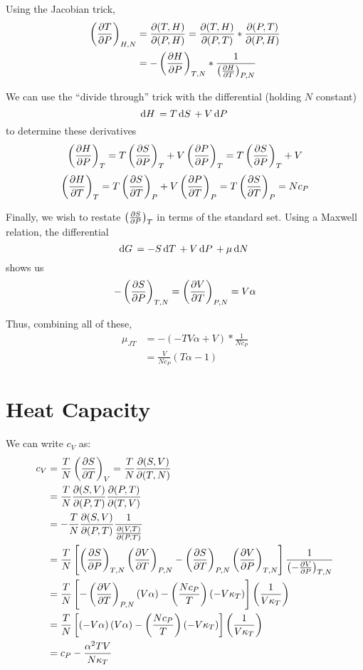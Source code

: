Using the Jacobian trick,
\begin{align*}
	\left(\frac{\partial T}{\partial P}\right)_{H,N}&=\frac{\partial (T,H)}{\partial (P,H)}=\frac{\partial (T,H)}{\partial (P,T)}*\frac{\partial (P,T)}{\partial (P,H)}\\
				      &=-\left(\frac{\partial H}{\partial P}\right)_{T,N}*\frac{1}{\left(\frac{\partial H}{\partial T}\right)_{P,N}}
\end{align*}

We can use the ``divide through'' trick with the differential (holding \(N\) constant)
\[\d{H}=T\d{S}+V\d{P}\]
to determine these derivatives
\[\left(\frac{\partial H}{\partial P}\right)_T=T\left(\frac{\partial S}{\partial P}\right)_T+V\left(\frac{\partial P}{\partial P}\right)_T=T\left(\frac{\partial S}{\partial P}\right)_T+V\]
\[\left(\frac{\partial H}{\partial T}\right)_T=T\left(\frac{\partial S}{\partial T}\right)_P+V\left(\frac{\partial P}{\partial T}\right)_P=T\left(\frac{\partial S}{\partial T}\right)_P=Nc_P\]

Finally, we wish to restate \(\left(\frac{\partial S}{\partial P}\right)_T\) in terms of the standard set. Using a Maxwell relation, the differential
\[\d{G}=-S\d{T}+V\d{P}+\mu\d{N}\]
shows us
\[-\left(\frac{\partial S}{\partial P}\right)_{T,N} = \left(\frac{\partial V}{\partial T}\right)_{P,N}=V\alpha\]

Thus, combining all of these,
\begin{align*}
	\mu_{JT}&=-(-TV\alpha+V)*\frac{1}{Nc_P}\\
		&=\frac{V}{Nc_P}(T\alpha-1)
\end{align*}

\section{Heat Capacity}
We can write \(c_V\) as:
\begin{align*}
	c_V&=\frac{T}{N}\left(\frac{\partial S}{\partial T}\right)_V=\frac{T}{N}\frac{\partial (S,V)}{\partial (T,N)}\\
	   &=\frac{T}{N}\frac{\partial (S,V)}{\partial (P,T)}\frac{\partial (P,T)}{\partial (T,V)}\\
	   &=-\frac{T}{N}\frac{\partial (S,V)}{\partial (P,T)}\frac{1}{\frac{\partial (V,T)}{\partial (P,T)}}\\
	   &=\frac{T}{N}\left[\left(\frac{\partial S}{\partial P}\right)_{T,N}\left(\frac{\partial V}{\partial T}\right)_{P,N}-\left(\frac{\partial S}{\partial T}\right)_{P,N}\left(\frac{\partial V}{\partial P}\right)_{T,N}\right]\frac{1}{\left(-\frac{\partial V}{\partial P}\right)_{T,N}}\\
	   &=\frac{T}{N}\left[-\left(\frac{\partial V}{\partial T}\right)_{P,N}\left(V\alpha\right)-\left(\frac{Nc_P}{T}\right)\left(-V\kappa_T\right)\right]\left(\frac{1}{V\kappa_T}\right)\\
	   &=\frac{T}{N}\left[\left(-V\alpha\right)\left(V\alpha\right)-\left(\frac{Nc_P}{T}\right)\left(-V\kappa_T\right)\right]\left(\frac{1}{V\kappa_T}\right)\\
	   &=c_P-\frac{\alpha^2TV}{N\kappa_T}
\end{align*}

